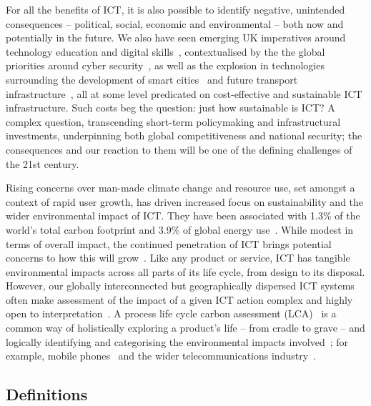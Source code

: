 \documentclass[conference]{IEEEtran}
\begin{document}
For all the benefits of ICT, it is also possible to identify negative,
unintended consequences -- political, social, economic and
environmental -- both now and potentially in the future. We also have
seen emerging UK imperatives around technology education and digital
skills~\cite{brown-et-al-toce2014}, contextualised by the the global
priorities around cyber security~\cite{carr+crick-csss2015}, as well
as the explosion in technologies surrounding the development of smart
cities~\cite{cosgrave-et-al:2014} and future transport
infrastructure~\cite{cooper-et-al-sose}, all at some level predicated
on cost-effective and sustainable ICT infrastructure. Such costs beg
the question: just how sustainable is ICT? A complex question,
transcending short-term policymaking and infrastructural investments,
underpinning both global competitiveness and national security; the
consequences and our reaction to them will be one of the defining
challenges of the 21st century.

Rising concerns over man-made climate change and resource use, set
amongst a context of rapid user growth, has driven increased focus on
sustainability and the wider environmental impact of ICT. They have
been associated with 1.3\% of the world's total carbon footprint and
3.9\% of global energy use~\cite{plepys:2002}. While modest in terms
of overall impact, the continued penetration of ICT brings potential
concerns to how this will grow~\cite{yi+thomas:2007}. Like any product
or service, ICT has tangible environmental impacts across all parts of
its life cycle, from design to its disposal. However, our globally
interconnected but geographically dispersed ICT systems often make
assessment of the impact of a given ICT action complex and highly open
to interpretation~\cite{andrae+andersen:2010}. A process life cycle
carbon assessment
(LCA)~\cite{baumann+tillman:2004,iso14040:2006,bsi2050:2011} is a
common way of holistically exploring a product's life -- from cradle
to grave -- and logically identifying and categorising the
environmental impacts involved~\cite{malmodin-et-al:2014}; for
example, mobile phones~\cite{frey-et-al:2008,fehske:2011} and the
wider telecommunications industry~\cite{scharnhorst:2008}.

\subsection{Definitions}
\end{document}
